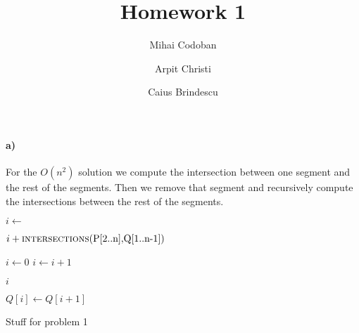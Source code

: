 \documentclass{article}
\title{Homework 1}
\author{Mihai Codoban \and Arpit Christi \and Caius Brindescu}
\begin{document}
\maketitle


\paragraph{a)} 
For the $O(n^2)$ solution we compute the intersection between one segment and the rest of the segments. Then we remove that segment and recursively compute the intersections between the rest of the segments.

\begin{algorithm}
\begin{algorithmic}[5]
  	\State $i \gets $  
	\State {} 

	\Return $i + \Call{intersections}{$P[2..n]$, $Q[1..n-1]$}$
  \EndFunction

	\State $i \gets 0$
		\State $i \gets i + 1$
	\EndWhile

	\Return $i$
  \EndFunction

		\State $Q[i] \gets Q[i + 1]$
	\EndFor
  \EndFunction
\end{algorithmic}
\end{algorithm}

Stuff for problem 1



\end{document}

